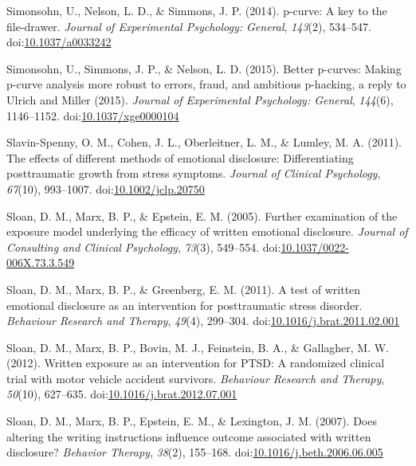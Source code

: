 \documentclass[english,man, mask]{apa6}
\theoremstyle{definition}
\theoremstyle{definition}
\theoremstyle{definition}
\theoremstyle{remark}
\begin{document}
\hypertarget{ref-Simonsohn2014}{}
Simonsohn, U., Nelson, L. D., \& Simmons, J. P. (2014). p-curve: A key
to the file-drawer. \emph{Journal of Experimental Psychology: General},
\emph{143}(2), 534--547.
doi:\href{https://doi.org/10.1037/a0033242}{10.1037/a0033242}

\hypertarget{ref-Simonsohn2015}{}
Simonsohn, U., Simmons, J. P., \& Nelson, L. D. (2015). Better p-curves:
Making p-curve analysis more robust to errors, fraud, and ambitious
p-hacking, a reply to Ulrich and Miller (2015). \emph{Journal of
Experimental Psychology: General}, \emph{144}(6), 1146--1152.
doi:\href{https://doi.org/10.1037/xge0000104}{10.1037/xge0000104}

\hypertarget{ref-Slavin-Spenny2011}{}
Slavin-Spenny, O. M., Cohen, J. L., Oberleitner, L. M., \& Lumley, M. A.
(2011). The effects of different methods of emotional disclosure:
Differentiating posttraumatic growth from stress symptoms. \emph{Journal
of Clinical Psychology}, \emph{67}(10), 993--1007.
doi:\href{https://doi.org/10.1002/jclp.20750}{10.1002/jclp.20750}

\hypertarget{ref-Sloan2005}{}
Sloan, D. M., Marx, B. P., \& Epstein, E. M. (2005). Further examination
of the exposure model underlying the efficacy of written emotional
disclosure. \emph{Journal of Consulting and Clinical Psychology},
\emph{73}(3), 549--554.
doi:\href{https://doi.org/10.1037/0022-006X.73.3.549}{10.1037/0022-006X.73.3.549}

\hypertarget{ref-Sloan2011a}{}
Sloan, D. M., Marx, B. P., \& Greenberg, E. M. (2011). A test of written
emotional disclosure as an intervention for posttraumatic stress
disorder. \emph{Behaviour Research and Therapy}, \emph{49}(4), 299--304.
doi:\href{https://doi.org/10.1016/j.brat.2011.02.001}{10.1016/j.brat.2011.02.001}

\hypertarget{ref-Sloan2012}{}
Sloan, D. M., Marx, B. P., Bovin, M. J., Feinstein, B. A., \& Gallagher,
M. W. (2012). Written exposure as an intervention for PTSD: A randomized
clinical trial with motor vehicle accident survivors. \emph{Behaviour
Research and Therapy}, \emph{50}(10), 627--635.
doi:\href{https://doi.org/10.1016/j.brat.2012.07.001}{10.1016/j.brat.2012.07.001}

\hypertarget{ref-Sloan2007}{}
Sloan, D. M., Marx, B. P., Epstein, E. M., \& Lexington, J. M. (2007).
Does altering the writing instructions influence outcome associated with
written disclosure? \emph{Behavior Therapy}, \emph{38}(2), 155--168.
doi:\href{https://doi.org/10.1016/j.beth.2006.06.005}{10.1016/j.beth.2006.06.005}
\end{document}
